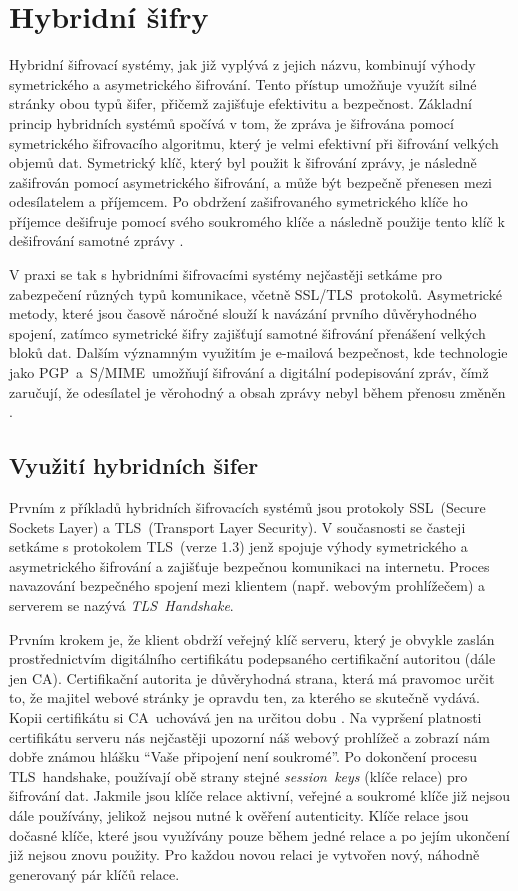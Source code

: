 \section{Hybridní šifry}
\label{sec:hybridni-sifra}

Hybridní šifrovací systémy, jak již vyplývá z jejich názvu, kombinují výhody symetrického a asymetrického šifrování. Tento přístup umožňuje využít silné stránky obou typů šifer, přičemž zajišťuje efektivitu a bezpečnost.
Základní princip hybridních systémů spočívá v tom, že zpráva je šifrována pomocí symetrického šifrovacího algoritmu, který je velmi efektivní při šifrování velkých objemů dat. Symetrický klíč, který byl použit k šifrování zprávy, je následně zašifrován pomocí asymetrického šifrování, a může být bezpečně přenesen mezi odesílatelem a příjemcem. Po obdržení zašifrovaného symetrického klíče ho příjemce dešifruje pomocí svého soukromého klíče a následně použije tento klíč k dešifrování samotné zprávy \parencite{pavlicek2012}.

V praxi se tak s hybridními šifrovacími systémy nejčastěji setkáme pro zabezpečení různých typů komunikace, včetně SSL/TLS~protokolů. Asymetrické metody, které jsou časově náročné slouží k navázání prvního důvěryhodného spojení, zatímco symetrické šifry zajišťují samotné šifrování přenášení velkých bloků dat. Dalším významným využitím je e-mailová bezpečnost, kde technologie jako PGP~a~S/MIME~umožňují šifrování a digitální podepisování zpráv, čímž zaručují, že odesílatel je věrohodný a obsah zprávy nebyl během přenosu změněn \mbox{\parencite{sedlak2021}.}

\subsection{Využití hybridních šifer}

Prvním z příkladů hybridních šifrovacích systémů jsou protokoly SSL~(Secure Sockets Layer) a TLS~(Transport Layer Security). V současnosti se časteji setkáme s protokolem TLS~(verze 1.3) jenž spojuje výhody symetrického a asymetrického šifrování a zajišťuje bezpečnou komunikaci na internetu. Proces navazování bezpečného spojení mezi klientem (např. webovým prohlížečem) a serverem se nazývá \emph{TLS~Handshake}. 

Prvním krokem je, že klient obdrží veřejný klíč serveru, který je obvykle zaslán prostřednictvím digitálního certifikátu podepsaného certifikační autoritou (dále jen CA). Certifikační autorita je důvěryhodná strana, která má pravomoc určit to, že majitel webové stránky je opravdu ten, za kterého se skutečně vydává. Kopii certifikátu si CA~uchovává jen na určitou dobu \parencite{cloudflare2024}. Na vypršení platnosti certifikátu serveru nás nejčastěji upozorní náš webový prohlížeč a zobrazí nám dobře známou hlášku \enquote{Vaše připojení není soukromé}. 
Po dokončení procesu TLS~handshake, používají obě strany stejné \emph{session~keys} (klíče relace) pro šifrování dat. Jakmile jsou klíče relace aktivní, veřejné a soukromé klíče již nejsou dále používány, jelikož~nejsou nutné k ověření autenticity. Klíče relace jsou dočasné klíče, které jsou využívány pouze během jedné relace a po jejím ukončení již nejsou znovu použity. Pro každou novou relaci je vytvořen nový, náhodně generovaný pár klíčů relace.


